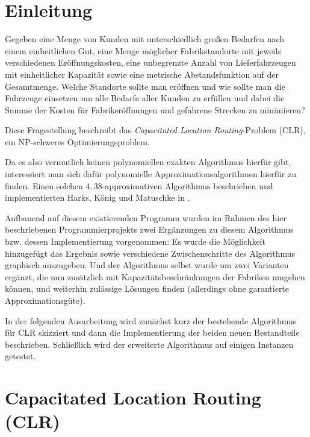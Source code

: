 \documentclass[a4paper,ngerman,11pt,bibtotoc]{scrartcl}
\theoremstyle{definition}
\theoremstyle{plain}
\theoremstyle{remark}
\newcommand{\CLR}{CLR}
\begin{document}


\tableofcontents

\newpage
	
\section*{Einleitung}

Gegeben eine Menge von Kunden mit unterschiedlich großen Bedarfen nach einem einheitlichen Gut, eine Menge möglicher Fabrikstandorte mit jeweils verschiedenen Eröffnungskosten, eine unbegrenzte Anzahl von Lieferfahrzeugen mit einheitlicher Kapazität sowie eine metrische Abstandsfunktion auf der Gesamtmenge. Welche Standorte sollte man eröffnen und wie sollte man die Fahrzeuge einsetzen um alle Bedarfe aller Kunden zu erfüllen und dabei die Summe der Kosten für Fabrikeröffnungen und gefahrene Strecken zu minimieren?

Diese Fragestellung beschreibt das \emph{Capacitated Location Routing}-Problem (\CLR), ein NP-schweres Optimierungsproblem.

Da es also vermutlich keinen polynomiellen exakten Algorithmus hierfür gibt, interessiert man sich dafür polynomielle Approximationsalgorithmen hierfür zu finden. Einen solchen $4,38$-approximativen Algorithmus beschrieben und implementierten Harks, König und Matuschke in \cite{AAfCLR}. 

Aufbauend auf diesem existierenden Programm wurden im Rahmen des hier beschriebenen Programmierprojekts zwei Ergänzungen zu diesem Algorithmus bzw. dessen Implementierung vorgenommen: Es wurde die Möglichkeit hinzugefügt das Ergebnis sowie verschiedene Zwischenschritte des Algorithmus graphisch auszugeben. Und der Algorithmus selbst wurde um zwei Varianten ergänzt, die nun zusätzlich mit Kapazitätsbeschränkungen der Fabriken umgehen können, und weiterhin zulässige Lösungen finden (allerdings ohne garantierte Approximationsgüte).

In der folgenden Ausarbeitung wird zunächst kurz der bestehende Algorithmus für \CLR{} skizziert und dann die Implementierung der beiden neuen Bestandteile beschrieben. Schließlich wird der erweiterte Algorithmus auf einigen Instanzen getestet.


\newpage

\section{Capacitated Location Routing (\CLR)}
\end{document}
